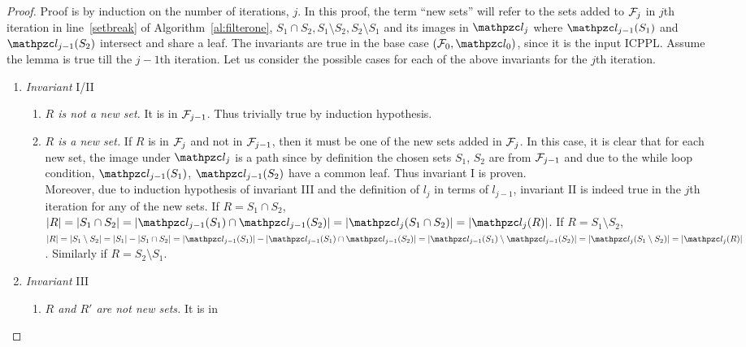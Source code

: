 \begin{proof}\thesisspacing
  Proof is by induction on the number of iterations, $j$. In this
  proof, the term ``new sets'' will refer to the sets added to ${\cal F}_j$
  in $j$th iteration in line~\ref{setbreak} of Algorithm~\ref{al:filterone},
  $S_1 \cap S_2, S_1 \setminus S_2, S_2 \setminus S_1$ and its images
  in $\cl_j$ where $\cl_{j-1}(S_1)$
  and $\cl_{j-1}(S_2)$ intersect and share a leaf.
  The invariants are true in the base case $(\cF_0, \cl_0)$, since it
  is the input ICPPL.  Assume the lemma is true till the $j-1$th
  iteration. Let us consider the possible cases for each of the above
  invariants for the $j$th iteration.
  
  \begin{enumerate}[\xbullet]
  \item {\em Invariant} I/II
    \begin{enumerate}[{I/II}a $|$] %
    \item {\em $R$ is not a new set.} It is in ${\cal F}_{j-1}$. Thus
      trivially true by induction hypothesis.
    \item {\em $R$ is a new set.} If $R$ is in ${\cal F}_{j}$ and not in
      ${\cal F}_{j-1}$, then it must be one of the new sets added in
      ${\cal F}_j$. In this case, it is clear that for each new set, the
      image under $\cl_j$ is a path since by definition the chosen
      sets $S_1$, $S_2$ are from ${\cal F}_{j-1}$ and due to the while loop
      condition, $\cl_{j-1}(S_1)$, $\cl_{j-1}(S_2)$ have a
      common leaf. Thus invariant I is proven.\\
      Moreover, due to induction hypothesis of invariant III and the
      definition of $l_j$ in terms of $l_{j-1}$, invariant II is
      indeed true in the $j$th iteration for any of the new sets.  If
      $R = S_1 \cap S_2$, $|R| = |S_1 \cap S_2| = |\cl_{j-1}(S_1) \cap
      \cl_{j-1}(S_2)| = |\cl_j(S_1 \cap S_2)| = |\cl_j(R)|$.  If $R =
      S_1 \setminus S_2$, $|R| = |S_1 \setminus S_2| = |S_1| - |S_1
      \cap S_2| = |\cl_{j-1}(S_1)| - |\cl_{j-1}(S_1) \cap
      \cl_{j-1}(S_2)| = |\cl_{j-1}(S_1) \setminus \cl_{j-1}(S_2)| =
      |\cl_j(S_1 \setminus S_2)|
      = |\cl_j(R)|$. Similarly if $R = S_2 \setminus S_1$.\\
    \end{enumerate}
  \item {\em Invariant} III
    \begin{enumerate}[{III}a $|$]
    \item {\em $R$ and $R'$ are not new sets.} It is in

\end{enumerate}
\end{enumerate}
\end{proof}
